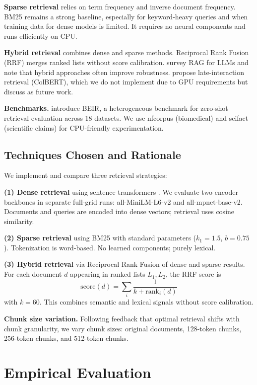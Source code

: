 \documentclass[twoside,11pt]{article}
\begin{document}
\textbf{Sparse retrieval} relies on term frequency and inverse document frequency. BM25 \citep{robertson2009probabilistic} remains a strong baseline, especially for keyword-heavy queries and when training data for dense models is limited. It requires no neural components and runs efficiently on CPU.

\textbf{Hybrid retrieval} combines dense and sparse methods. Reciprocal Rank Fusion (RRF) merges ranked lists without score calibration. \citet{gao2022rag} survey RAG for LLMs and note that hybrid approaches often improve robustness. \citet{khattab2020colbert} propose late-interaction retrieval (ColBERT), which we do not implement due to GPU requirements but discuss as future work.

\textbf{Benchmarks.} \citet{thakur2021beir} introduce BEIR, a heterogeneous benchmark for zero-shot retrieval evaluation across 18 datasets. We use nfcorpus (biomedical) and scifact (scientific claims) for CPU-friendly experimentation.

\subsection{Techniques Chosen and Rationale}

We implement and compare three retrieval strategies:

\textbf{(1) Dense retrieval} using sentence-transformers \citep{reimers2019sentencebert}. We evaluate two encoder backbones in separate full-grid runs: all-MiniLM-L6-v2 and all-mpnet-base-v2. Documents and queries are encoded into dense vectors; retrieval uses cosine similarity.

\textbf{(2) Sparse retrieval} using BM25 with standard parameters ($k_1 = 1.5$, $b = 0.75$). Tokenization is word-based. No learned components; purely lexical.

\textbf{(3) Hybrid retrieval} via Reciprocal Rank Fusion of dense and sparse results. For each document $d$ appearing in ranked lists $L_1, L_2$, the RRF score is
$$
\text{score}(d) = \sum_{i} \frac{1}{k + \text{rank}_i(d)}
$$
with $k = 60$. This combines semantic and lexical signals without score calibration.

\textbf{Chunk size variation.} Following feedback that optimal retrieval shifts with chunk granularity, we vary chunk sizes: original documents, 128-token chunks, 256-token chunks, and 512-token chunks.

\section{Empirical Evaluation}
\end{document}
